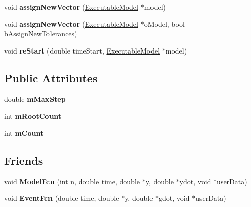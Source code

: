 \begin{DoxyCompactItemize}
\item 
\hypertarget{classrr_1_1_cvode_interface_af52d5551e4f2fbb0ef9613ae2b374f2f}{void {\bfseries assign\-New\-Vector} (\hyperlink{classrr_1_1_executable_model}{Executable\-Model} $\ast$model)}\label{classrr_1_1_cvode_interface_af52d5551e4f2fbb0ef9613ae2b374f2f}

\item 
\hypertarget{classrr_1_1_cvode_interface_af4aa258a88d7f1560052f5de0e5b45d9}{void {\bfseries assign\-New\-Vector} (\hyperlink{classrr_1_1_executable_model}{Executable\-Model} $\ast$o\-Model, bool b\-Assign\-New\-Tolerances)}\label{classrr_1_1_cvode_interface_af4aa258a88d7f1560052f5de0e5b45d9}

\item 
\hypertarget{classrr_1_1_cvode_interface_a83413156312172a147360ebba88736a2}{void {\bfseries re\-Start} (double time\-Start, \hyperlink{classrr_1_1_executable_model}{Executable\-Model} $\ast$model)}\label{classrr_1_1_cvode_interface_a83413156312172a147360ebba88736a2}

\end{DoxyCompactItemize}
\subsection*{Public Attributes}
\begin{DoxyCompactItemize}
\item 
\hypertarget{classrr_1_1_cvode_interface_abfbb4801d5231b78ffca8e27009a2f0b}{double {\bfseries m\-Max\-Step}}\label{classrr_1_1_cvode_interface_abfbb4801d5231b78ffca8e27009a2f0b}

\item 
\hypertarget{classrr_1_1_cvode_interface_a0d1a13d3d1549cf6c6936728ffc15b86}{int {\bfseries m\-Root\-Count}}\label{classrr_1_1_cvode_interface_a0d1a13d3d1549cf6c6936728ffc15b86}

\item 
\hypertarget{classrr_1_1_cvode_interface_af859abecac616981381255722d47fe23}{int {\bfseries m\-Count}}\label{classrr_1_1_cvode_interface_af859abecac616981381255722d47fe23}

\end{DoxyCompactItemize}
\subsection*{Friends}
\begin{DoxyCompactItemize}
\item 
\hypertarget{classrr_1_1_cvode_interface_aab5ad105a2f1062a16b8554a04826b58}{void {\bfseries Model\-Fcn} (int n, double time, double $\ast$y, double $\ast$ydot, void $\ast$user\-Data)}\label{classrr_1_1_cvode_interface_aab5ad105a2f1062a16b8554a04826b58}

\item 
\hypertarget{classrr_1_1_cvode_interface_a5295dd05243a3c4665513ca432580490}{void {\bfseries Event\-Fcn} (double time, double $\ast$y, double $\ast$gdot, void $\ast$user\-Data)}\label{classrr_1_1_cvode_interface_a5295dd05243a3c4665513ca432580490}

\end{DoxyCompactItemize}
